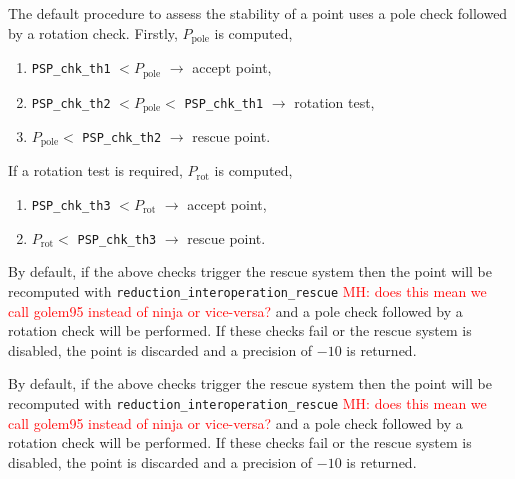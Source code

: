 The default procedure to assess the stability of a point uses a pole check followed by a rotation check.
Firstly, $P_\mathrm{pole}$ is computed,
\begin{enumerate}
\item \texttt{PSP\_chk\_th1} $< P_\mathrm{pole}$ $\rightarrow$ accept point,
\item \texttt{PSP\_chk\_th2} $< P_\mathrm{pole} < $ \texttt{PSP\_chk\_th1} $\rightarrow$ rotation test,
\item $P_\mathrm{pole} <$ \texttt{PSP\_chk\_th2} $\rightarrow$ rescue point.
\end{enumerate}
If a rotation test is required, $P_\mathrm{rot}$ is computed,
\begin{enumerate}
\item \texttt{PSP\_chk\_th3} $< P_\mathrm{rot}$ $\rightarrow$ accept point,
\item  $P_\mathrm{rot} <$ \texttt{PSP\_chk\_th3} $\rightarrow$ rescue point.
\end{enumerate}

By default, if the above checks trigger the rescue system then the point will be recomputed with \texttt{reduction\_interoperation\_rescue} \textcolor{red}{MH: does this mean we call golem95 instead of ninja or vice-versa?} and a pole check followed by a rotation check will be performed.
If these checks fail or the rescue system is disabled, the point is discarded and a precision of $-10$ is returned.

By default, if the above checks trigger the rescue system then the point will be recomputed with \texttt{reduction\_interoperation\_rescue} \textcolor{red}{MH: does this mean we call golem95 instead of ninja or vice-versa?} and a pole check followed by a rotation check will be performed.
If these checks fail or the rescue system is disabled, the point is discarded and a precision of $-10$ is returned.

